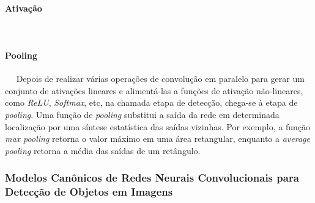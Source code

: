 \paragraph{Ativação}
\ \ \newline

\paragraph{Pooling}
\ \ \newline
Depois de realizar várias operações de convolução em paralelo para gerar um conjunto de ativações lineares e alimentá-las a funções de ativação não-lineares, como \emph{ReLU}, \emph{Softmax}, etc, na chamada etapa de detecção, chega-se à etapa de \emph{pooling}. Uma função de \emph{pooling} substitui a saída da rede em determinada localização por uma síntese estatística das saídas vizinhas. Por exemplo, a função \emph{max pooling} retorna o valor máximo em uma área retangular, enquanto a \emph{average pooling} retorna a média das saídas de um retângulo. %


\subsubsection{Modelos Canônicos de Redes Neurais Convolucionais para Detecção de Objetos em Imagens}
